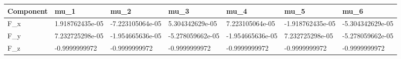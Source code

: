 \begin{tabular}{@{}lllllll@{}}
\toprule
Component & mu\_1 & mu\_2 & mu\_3 & mu\_4 & mu\_5 & mu\_6 \\
\midrule
F\_x & 1.918762435e-05 & -7.223105064e-05 & 5.304342629e-05 & 7.223105064e-05 & -1.918762435e-05 & -5.304342629e-05 \\
F\_y & 7.232725298e-05 & -1.954665636e-05 & -5.278059662e-05 & -1.954665636e-05 & 7.232725298e-05 & -5.278059662e-05 \\
F\_z & -0.9999999972 & -0.9999999972 & -0.9999999972 & -0.9999999972 & -0.9999999972 & -0.9999999972 \\
\bottomrule
\end{tabular}
